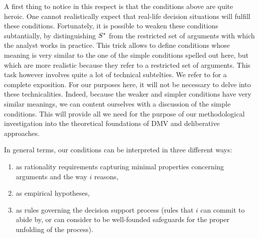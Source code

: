 \documentclass[version=3.21, pagesize, twoside=off, bibliography=totoc, DIV=calc, fontsize=12pt, a4paper, french, english]{scrartcl}
\begin{document}
A first thing to notice in this respect is that the conditions above are quite heroic. 
One cannot realistically expect that real-life decision situations will fulfill these conditions. 
Fortunately, it is possible to weaken these conditions subtantially, by distinguishing $S^*$ from the restricted set of arguments with which the analyst works in practice. 
This trick allows to define conditions whose meaning is very similar to the one of the simple conditions spelled out here, but which are more realistic because they refer to a restricted set of arguments. 
This task however involves quite a lot of technical subtelties. We refer to \citet{cailloux_formal_2018} for a complete exposition. For our purposes here, it will not be necessary to delve into these technicalities. 
Indeed, because the weaker and simpler conditions have very similar meanings, we can content ourselves with a discussion of the simple conditions. 
This will provide all we need for the purpose of our methodological investigation into the theoretical foundations of DMV and deliberative approaches.

In general terms, our conditions can be interpreted in three different ways:
\begin{enumerate}[label=\emph{\roman*}, ref=\emph{\roman*}]
	\item \label{inter:axioms} as rationality requirements capturing minimal properties concerning arguments and the way $i$ reasons,
	\item \label{inter:empir} as empirical hypotheses,
	\item \label{inter:rules} as rules governing the decision support process (rules that $i$ can commit to abide by, or can consider to be well-founded safeguards for the proper unfolding of the process).
\end{enumerate}
\end{document}
